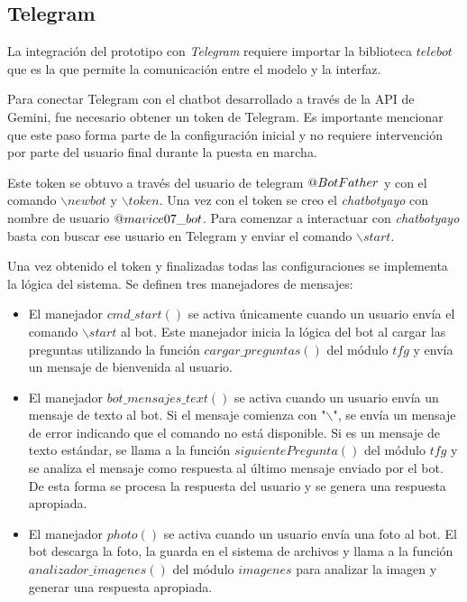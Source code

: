 \subsection{Telegram}
\label{sec:Telegram}
La integración del prototipo con \textit{Telegram} requiere importar la biblioteca $telebot$ que es la que permite la comunicación entre el modelo y la interfaz. 

Para conectar Telegram con el chatbot desarrollado a través de la API de Gemini, fue necesario obtener un token de Telegram. Es importante mencionar que este paso forma parte de la configuración inicial y no requiere intervención por parte del usuario final durante la puesta en marcha.

Este token se obtuvo a través del usuario de telegram $\makeatletter @ BotFather$ y con el comando $\backslash newbot$ y $\backslash token$. Una vez con el token se creo el \textit{chatbotyayo} con nombre de usuario $\makeatletter @ mavice07\_bot$. Para comenzar a interactuar con \textit{chatbotyayo} basta con buscar ese usuario en Telegram y enviar el comando $\backslash start$. 

Una vez obtenido el token y finalizadas todas las configuraciones se implementa la lógica del sistema. Se definen tres manejadores de mensajes:
	\begin{itemize}
		\item El manejador $cmd\_start()$ se activa únicamente cuando un usuario envía el comando $\backslash start$ al bot. Este manejador inicia la lógica del bot al cargar las preguntas utilizando la función $cargar\_preguntas()$ del módulo $tfg$ y envía un mensaje de bienvenida al usuario.
		
		\item El manejador $bot\_mensajes\_text()$ se activa cuando un usuario envía un mensaje de texto al bot. Si el mensaje comienza con "$\backslash$", se envía un mensaje de error indicando que el comando no está disponible. Si es un mensaje de texto estándar, se llama a la función $siguientePregunta()$ del módulo $tfg$ y se analiza el mensaje como respuesta al último mensaje enviado por el bot. De esta forma se procesa la respuesta del usuario y se genera una respuesta apropiada.
		
		\item El manejador $photo()$ se activa cuando un usuario envía una foto al bot. El bot descarga la foto, la guarda en el sistema de archivos y llama a la función $analizador\_imagenes()$ del módulo $imagenes$ para analizar la imagen y generar una respuesta apropiada.
	\end{itemize}
	
